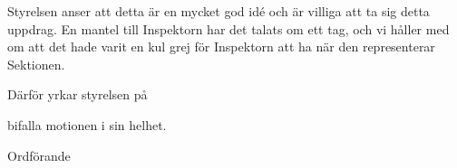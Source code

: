 \documentclass[../_main/handlingar.tex]{subfiles}
\begin{document}
\motionssvar

Styrelsen anser att detta är en mycket god idé och är villiga att ta sig detta uppdrag. En mantel till Inspektorn har det talats om ett tag, och vi håller med om att det hade varit en kul grej för Inspektorn att ha när den representerar Sektionen.

Därför yrkar styrelsen på
\begin{attsatser}
    \att bifalla motionen i sin helhet.
\end{attsatser}

\begin{signatures}{1}
    \ist
    \signature{Erik Månsson}{Ordförande}
\end{signatures}
\end{document}
